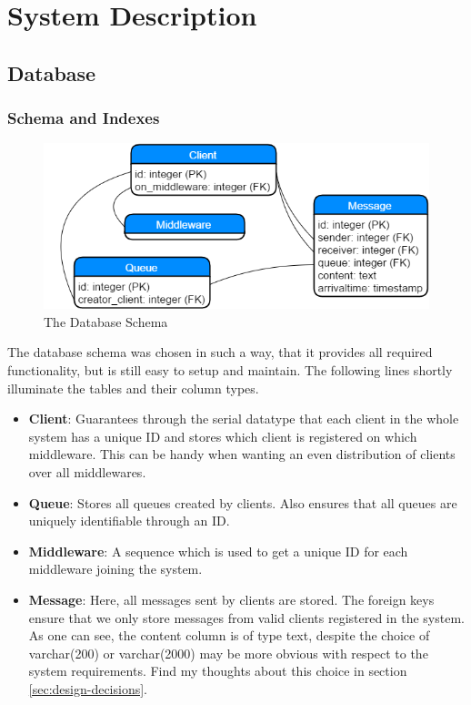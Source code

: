 \documentclass[11pt]{article}
\begin{document}
\maketitle

\newpage

\section{System Description}\label{sec:system-description}

\subsection{Database}\label{sec:database}

\subsubsection{Schema and Indexes}\label{sec:schema-and-indexes}
\begin{figure}[!ht]
\centering
\includegraphics[width=0.6\linewidth]{figures/database/db_schema}
\caption{The Database Schema}
\label{fig:db_schema}
\end{figure}
The database schema was chosen in such a way, that it provides all required functionality, but is still easy to setup and maintain. The following lines shortly illuminate the tables and their column types.
\begin{itemize}
	\item \textbf{Client}: Guarantees through the serial datatype that each client in the whole system has a unique ID and stores which client is registered on which middleware. This can be handy when wanting an even distribution of clients over all middlewares.
	\item \textbf{Queue}: Stores all queues created by clients. Also ensures that all queues are uniquely identifiable through an ID.
	\item \textbf{Middleware}: A sequence which is used to get a unique ID for each middleware joining the system.
	\item \textbf{Message}: Here, all messages sent by clients are stored. The foreign keys ensure that we only store messages from valid clients registered in the system. As one can see, the content column is of type text, despite the choice of varchar(200) or varchar(2000) may be more obvious with respect to the system requirements. Find my thoughts about this choice in section \ref{sec:design-decisions}.
\end{itemize}
\end{document}
